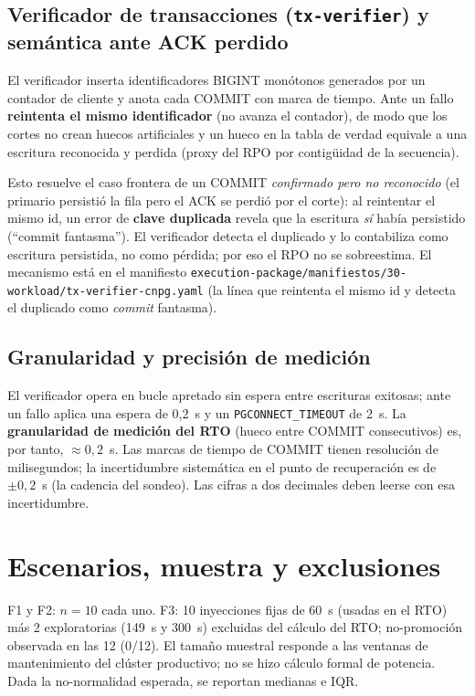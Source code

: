 \documentclass[11pt,letterpaper]{article}
\begin{document}
\subsection{Verificador de transacciones (\texttt{tx-verifier}) y semántica ante ACK perdido}
El verificador inserta identificadores BIGINT monótonos generados por un contador de cliente y anota cada COMMIT con marca de tiempo. Ante un fallo \textbf{reintenta el mismo identificador} (no avanza el contador), de modo que los cortes no crean huecos artificiales y un hueco en la tabla de verdad equivale a una escritura reconocida y perdida (proxy del RPO por contigüidad de la secuencia).

Esto resuelve el caso frontera de un COMMIT \emph{confirmado pero no reconocido} (el primario persistió la fila pero el ACK se perdió por el corte): al reintentar el mismo id, un error de \textbf{clave duplicada} revela que la escritura \emph{sí} había persistido (``commit fantasma''). El verificador detecta el duplicado y lo contabiliza como escritura persistida, no como pérdida; por eso el RPO no se sobreestima. El mecanismo está en el manifiesto \texttt{execution-package/manifiestos/30-workload/tx-verifier-cnpg.yaml} (la línea que reintenta el mismo id y detecta el duplicado como \emph{commit} fantasma).

\subsection{Granularidad y precisión de medición}
El verificador opera en bucle apretado sin espera entre escrituras exitosas; ante un fallo aplica una espera de 0{,}2~s y un \texttt{PGCONNECT\_TIMEOUT} de 2~s. La \textbf{granularidad de medición del RTO} (hueco entre COMMIT consecutivos) es, por tanto, $\approx 0{,}2$~s. Las marcas de tiempo de COMMIT tienen resolución de milisegundos; la incertidumbre sistemática en el punto de recuperación es de $\pm 0{,}2$~s (la cadencia del sondeo). Las cifras a dos decimales deben leerse con esa incertidumbre.

\section{Escenarios, muestra y exclusiones}
F1 y F2: $n=10$ cada uno. F3: 10 inyecciones fijas de 60~s (usadas en el RTO) más 2 exploratorias (149~s y 300~s) excluidas del cálculo del RTO; no-promoción observada en las 12 (0/12). El tamaño muestral responde a las ventanas de mantenimiento del clúster productivo; no se hizo cálculo formal de potencia. Dada la no-normalidad esperada, se reportan medianas e IQR.
\end{document}
